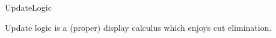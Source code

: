 \begin{entry}{UpdateLogic}

\begin{technicalities}
  Update logic  is a (proper) display calculus which  enjoys  cut elimination. 
\end{technicalities}

\end{entry}
